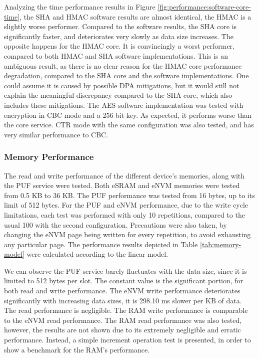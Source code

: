 Analyzing the time performance results in Figure \ref{fig:performance:software-core-time}, the SHA and HMAC software results are almost identical, the HMAC is a slightly worse performer. Compared to the software results, the SHA core is significantly faster, and deteriorates very slowly as data size increases. The opposite happens for the HMAC core. It is convincingly a worst performer, compared to both HMAC and SHA software implementations. 
This is an ambiguous result, as there is no clear reason for the HMAC core performance degradation, compared to the SHA core and the software implementations. One could assume it is caused by possible DPA mitigations, but it would still not explain the meaningful discrepancy compared to the SHA core, which also includes these mitigations.
The AES software implementation was tested with encryption in CBC mode and a 256 bit key. As expected, it performs worse than the core service. CTR mode with the same configuration was also tested, and has very similar performance to CBC.

\subsubsection*{Memory Performance}\label{chap:evaluation:services:memory}

The read and write performance of the different device's memories, along with the PUF service were tested. Both eSRAM and eNVM memories were tested from 0.5 KB to 36 KB. The PUF performance was tested from 16 bytes, up to its limit of 512 bytes. For the PUF and eNVM performance, due to the write cycle limitations, each test was performed with only 10 repetitions, compared to the usual 100 with the second configuration. Precautions were also taken, by changing the eNVM page being written for every repetition, to avoid exhausting any particular page.
The performance results depicted in Table \ref{tab:memory-model} were calculated according to the linear model.



We can observe the PUF service barely fluctuates with the data size, since it is limited to 512 bytes per slot. The constant value is the significant portion, for both read and write performance.
The eNVM write performance deteriorates significantly with increasing data sizes, it is 298.10 ms slower per KB of data. The read performance is negligible.
The RAM write performance is comparable to the eNVM read performance. The RAM read performance was also tested, however, the results are not shown due to its extremely negligible and erratic performance. Instead, a simple increment operation test is presented, in order to show a benchmark for the RAM's performance.

